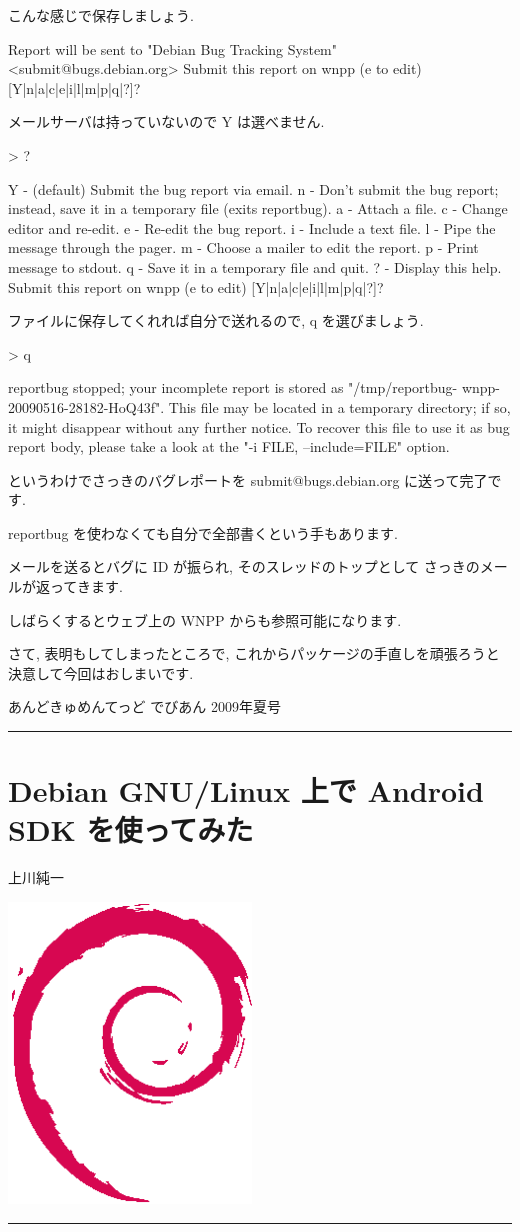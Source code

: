\documentclass[mingoth,a4paper]{jsarticle}
\renewcommand{\dancersection}[2]{%
\newpage
あんどきゅめんてっど でびあん 2009年夏号
%
\vspace{0.1mm}\\
{\color{dancerlightblue}\rule{\hsize}{2mm}}

%
%
\begin{minipage}[t]{0.6\hsize}
\color{dancerdarkblue}
\vspace{1cm}
\section{#1}
\hfill{}#2\\
\end{minipage}
\begin{minipage}[t]{0.4\hsize}
\vspace{-2cm}
\hfill{}\includegraphics[height=8cm]{image200502/openlogo-nd.eps}\\
\vspace{-5cm}
\end{minipage}
%
%
{\color{dancerdarkblue}\rule{0.74\hsize}{2mm}}
%
\vspace{2cm}
}
\begin{document}
\begin{commandline}
こんな感じで保存しましょう.

\begin{commandline}
Report will be sent to "Debian Bug Tracking System" <submit@bugs.debian.org>
Submit this report on wnpp (e to edit) [Y|n|a|c|e|i|l|m|p|q|?]?
\end{commandline}

メールサーバは持っていないので Y は選べません.

\begin{commandline}
> ?

Y - (default) Submit the bug report via email.
n - Don't submit the bug report; instead, save it in a temporary file (exits
    reportbug).
a - Attach a file.
c - Change editor and re-edit.
e - Re-edit the bug report.
i - Include a text file.
l - Pipe the message through the pager.
m - Choose a mailer to edit the report.
p - Print message to stdout.
q - Save it in a temporary file and quit.
? - Display this help.
Submit this report on wnpp (e to edit) [Y|n|a|c|e|i|l|m|p|q|?]? 
\end{commandline}

ファイルに保存してくれれば自分で送れるので, q を選びましょう.

\begin{commandline}
> q

reportbug stopped; your incomplete report is stored as "/tmp/reportbug-
wnpp-20090516-28182-HoQ43f". This file may be located in a temporary directory;
if so, it might disappear without any further notice. To recover this file to
use it as bug report body, please take a look at the "-i FILE, --include=FILE"
option.
\end{commandline}

というわけでさっきのバグレポートを submit@bugs.debian.org に送って完了です.

reportbug を使わなくても自分で全部書くという手もあります.

メールを送るとバグに ID が振られ, そのスレッドのトップとして
さっきのメールが返ってきます.

しばらくするとウェブ上の WNPP からも参照可能になります.

さて, 表明もしてしまったところで, これからパッケージの手直しを頑張ろうと
決意して今回はおしまいです.

\dancersection{Debian GNU/Linux 上で Android SDK を使ってみた}{上川純一}


\end{commandline}
\end{document}

